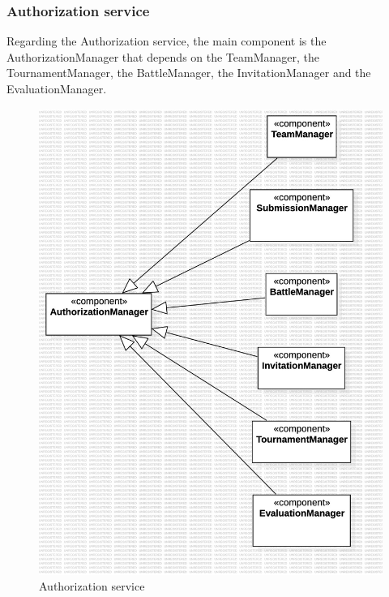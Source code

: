 \subsubsection*{Authorization service}
Regarding the Authorization service, the main component is the AuthorizationManager that depends on the TeamManager, the TournamentManager, the BattleManager, the InvitationManager and the EvaluationManager.
\begin{figure}[H]
    \centering
    \includegraphics[width=\textwidth]{Diagrams/AuthorizationIntegrationPlan.jpg}
    \caption{Authorization service}
    \label{fig:authorization}
\end{figure}


